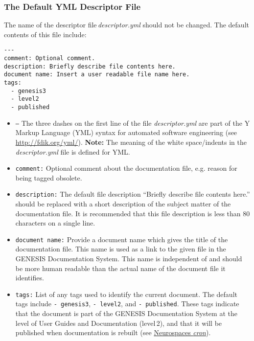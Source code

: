 \documentclass[12pt]{article}
\begin{document}
\subsubsection*{The Default YML Descriptor File}

The name of the descriptor file\,{\it descriptor.yml} should not be changed. The default contents of this file include:

\begin{verbatim}
---
comment: Optional comment.
description: Briefly describe file contents here. 
document name: Insert a user readable file name here.  
tags:
  - genesis3
  - level2
  - published
\end{verbatim}

\begin{itemize}

\item {\tt ---} The three dashes on the first line of the file {\it descriptor.yml} are part of the Y Markup Language (YML) syntax for automated software engineering (see \href{http://fdik.org/yml/}{http://fdik.org/yml/}). {\bf Note:} The meaning of the white space/indents in the\,{\it descriptor.yml} file is defined for YML.

\item {\tt comment:} Optional comment about the documentation file, e.g. reason for being tagged obsolete.

\item {\tt description:} The default file description ``Briefly describe file contents here.'' should be replaced with a short description of the subject matter of the documentation file. It is recommended that this file description is less than 80 characters on a single line.

\item {\tt document name:} Provide a document name which gives the title of the documentation file. This name is used as a link to the given file in the GENESIS Documentation System. This name is independent of and should be more human readable than the actual name of the document file it identifies.

\item {\tt tags:} List of any tags used to identify the current document. The default tags include {\tt -\,genesis3}, {\tt -\,level2}, and {\tt -\,published}. These tags indicate that the document is part of the GENESIS Documentation System at the level of User Guides and Documentation (level\,2), and that it will be published when documentation is rebuilt (see \href{../neurospaces-cron/neurospaces-cron.tex}{Neurospaces {\it cron}}).


\end{itemize}
\end{document}
